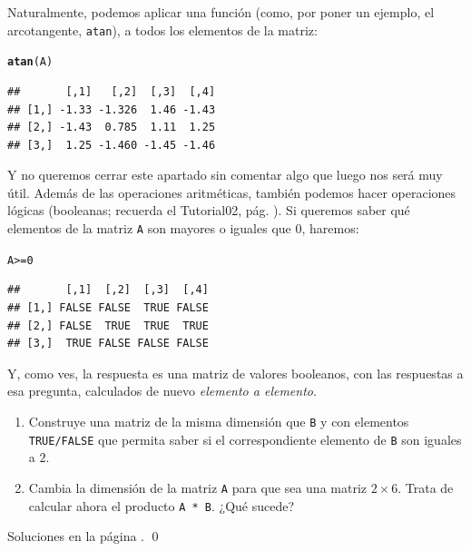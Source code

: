 \documentclass[10pt,a4paper]{article}\usepackage[]{graphicx}\usepackage[]{color}
\makeatletter
\newcommand{\hlnum}[1]{\textcolor[rgb]{0.686,0.059,0.569}{#1}}%
\newcommand{\hlopt}[1]{\textcolor[rgb]{0,0,0}{#1}}%
\newcommand{\hlstd}[1]{\textcolor[rgb]{0.345,0.345,0.345}{#1}}%
\newcommand{\hlkwd}[1]{\textcolor[rgb]{0.737,0.353,0.396}{\textbf{#1}}}%
\newenvironment{kframe}{%
 \def\at@end@of@kframe{}%
 \ifinner\ifhmode%
  \def\at@end@of@kframe{\end{minipage}}%
  \begin{minipage}{\columnwidth}%
 \fi\fi%
 \def\FrameCommand##1{\hskip\@totalleftmargin \hskip-\fboxsep
 \colorbox{shadecolor}{##1}\hskip-\fboxsep
     \hskip-\linewidth \hskip-\@totalleftmargin \hskip\columnwidth}%
 \MakeFramed {\advance\hsize-\width
   \@totalleftmargin\z@ \linewidth\hsize
   \@setminipage}}%
 {\par\unskip\endMakeFramed%
 \at@end@of@kframe}
\newenvironment{knitrout}{}{} %
\makeatother
\begin{document}
Naturalmente, podemos aplicar una función (como, por poner un ejemplo, el arcotangente, {\tt atan}), a todos los elementos de la matriz:
\begin{knitrout}
\color{fgcolor}\begin{kframe}
\begin{alltt}
    \hlkwd{atan}\hlstd{(A)}
\end{alltt}
\begin{verbatim}
##       [,1]   [,2]  [,3]  [,4]
## [1,] -1.33 -1.326  1.46 -1.43
## [2,] -1.43  0.785  1.11  1.25
## [3,]  1.25 -1.460 -1.45 -1.46
\end{verbatim}
\end{kframe}
\end{knitrout}
Y no queremos cerrar este apartado sin comentar algo que luego nos será muy útil. Además de las operaciones aritméticas, también podemos hacer operaciones lógicas (booleanas; recuerda el Tutorial02, pág. \pageref{tut02-tut02:subsubsec:SeleccionElementosCondicionesValoresBooleanosWhich}). Si queremos saber qué elementos de la matriz {\tt A} son mayores o iguales que $0$, haremos:
\begin{knitrout}
\color{fgcolor}\begin{kframe}
\begin{alltt}
    \hlstd{A} \hlopt{>=} \hlnum{0}
\end{alltt}
\begin{verbatim}
##       [,1]  [,2]  [,3]  [,4]
## [1,] FALSE FALSE  TRUE FALSE
## [2,] FALSE  TRUE  TRUE  TRUE
## [3,]  TRUE FALSE FALSE FALSE
\end{verbatim}
\end{kframe}
\end{knitrout}
Y, como ves, la respuesta es una matriz de valores booleanos, con las respuestas a esa pregunta, calculados de nuevo {\em elemento a elemento}.

\begin{ejercicio}
\label{tut03:ejercicio08}
\quad
\begin{enumerate}
  \item Construye una matriz de la misma dimensión que {\tt B} y con elementos {\tt TRUE/FALSE} que permita saber si el correspondiente elemento de {\tt B} son iguales a $2$.
  \item Cambia la dimensión de la matriz {\tt A} para que sea una matriz $2\times 6$. Trata de calcular ahora el producto {\tt A * B}. ¿Qué sucede?
\end{enumerate}
Soluciones en la página \pageref{tut03:ejercicio08:sol}.
\qed
\end{ejercicio}
\end{document}
